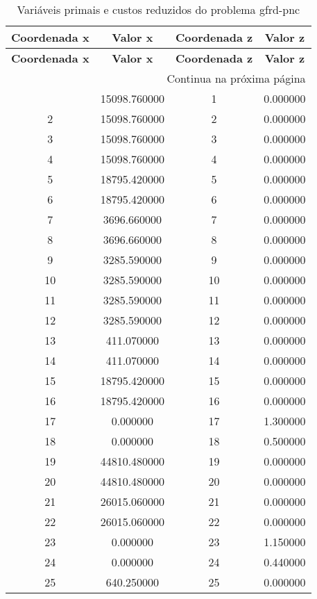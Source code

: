\documentclass[12pt]{article}
\begin{document}
\begin{longtable}{@{}cccc@{}}
\caption{Variáveis primais e custos reduzidos do problema gfrd-pnc} \\
\toprule
\textbf{Coordenada x} & \textbf{Valor x} & \textbf{Coordenada z} & \textbf{Valor z} \\
\midrule
\endfirsthead

\toprule
\textbf{Coordenada x} & \textbf{Valor x} & \textbf{Coordenada z} & \textbf{Valor z} \\
\midrule
\endhead

\midrule \multicolumn{4}{r}{{Continua na próxima página}} \\ \midrule
\endfoot

\bottomrule
\endlastfoot
1 & 15098.760000 & 1 & 0.000000 \\
2 & 15098.760000 & 2 & 0.000000 \\
3 & 15098.760000 & 3 & 0.000000 \\
4 & 15098.760000 & 4 & 0.000000 \\
5 & 18795.420000 & 5 & 0.000000 \\
6 & 18795.420000 & 6 & 0.000000 \\
7 & 3696.660000 & 7 & 0.000000 \\
8 & 3696.660000 & 8 & 0.000000 \\
9 & 3285.590000 & 9 & 0.000000 \\
10 & 3285.590000 & 10 & 0.000000 \\
11 & 3285.590000 & 11 & 0.000000 \\
12 & 3285.590000 & 12 & 0.000000 \\
13 & 411.070000 & 13 & 0.000000 \\
14 & 411.070000 & 14 & 0.000000 \\
15 & 18795.420000 & 15 & 0.000000 \\
16 & 18795.420000 & 16 & 0.000000 \\
17 & 0.000000 & 17 & 1.300000 \\
18 & 0.000000 & 18 & 0.500000 \\
19 & 44810.480000 & 19 & 0.000000 \\
20 & 44810.480000 & 20 & 0.000000 \\
21 & 26015.060000 & 21 & 0.000000 \\
22 & 26015.060000 & 22 & 0.000000 \\
23 & 0.000000 & 23 & 1.150000 \\
24 & 0.000000 & 24 & 0.440000 \\
25 & 640.250000 & 25 & 0.000000 \\

\end{longtable}
\end{document}
